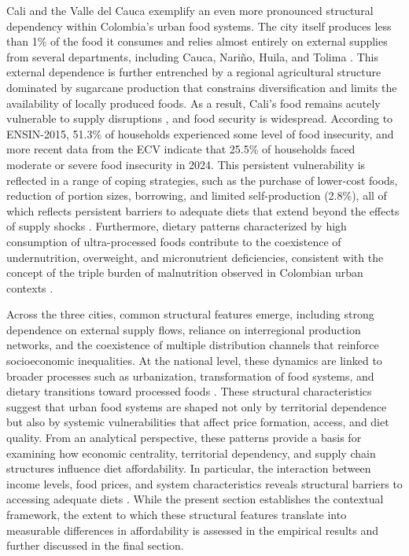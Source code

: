 \documentclass[Afour, sageh,times]{sagej}
\begin{document}
\smallskip

Cali and the Valle del Cauca exemplify an even more pronounced structural dependency within Colombia's urban food systems. The city itself produces less than 1\% of the food it consumes and relies almost entirely on external supplies from several departments, including Cauca, Nariño, Huila, and Tolima \citep{Rankin2021}. This external dependence is further entrenched by a regional agricultural structure dominated by sugarcane production that constrains diversification and limits the availability of locally produced foods. As a result, Cali's food remains acutely vulnerable to supply disruptions \citep{Rankin2021, WLE2019}, and food security is widespread. According to ENSIN-2015, 51.3\% of households experienced some level of food insecurity, and more recent data from the ECV indicate that 25.5\% of households faced moderate or severe food insecurity in 2024. This persistent vulnerability is reflected in a range of coping strategies, such as the purchase of lower-cost foods, reduction of portion sizes, borrowing, and limited self-production (2.8\%), all of which reflects persistent barriers to adequate diets that extend beyond the effects of supply shocks \citep{Rankin2021}. Furthermore, dietary patterns characterized by high consumption of ultra-processed foods contribute to the coexistence of undernutrition, overweight, and micronutrient deficiencies, consistent with the concept of the triple burden of malnutrition observed in Colombian urban contexts \citep{McCullumGomez2025}.

\smallskip

Across the three cities, common structural features emerge, including strong dependence on external supply flows, reliance on interregional production networks, and the coexistence of multiple distribution channels that reinforce socioeconomic inequalities. At the national level, these dynamics are linked to broader processes such as urbanization, transformation of food systems, and dietary transitions toward processed foods \citep{HLPE2020, FAO2021SOFI}. These structural characteristics suggest that urban food systems are shaped not only by territorial dependence but also by systemic vulnerabilities that affect price formation, access, and diet quality. From an analytical perspective, these patterns provide a basis for examining how economic centrality, territorial dependency, and supply chain structures influence diet affordability. In particular, the interaction between income levels, food prices, and system characteristics reveals structural barriers to accessing adequate diets \citep{Masters2018, Bai2020, Hirvonen2020, Bai2022Lancet, Yoshioka2026}. While the present section establishes the contextual framework, the extent to which these structural features translate into measurable differences in affordability is assessed in the empirical results and further discussed in the final section.
\end{document}
